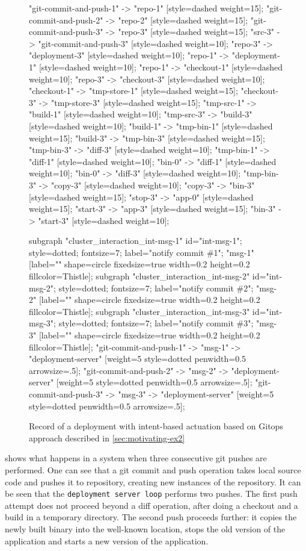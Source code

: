 \begin{figure}[p]
\begin{sideways}
{"git-commit-and-push-1" -> "repo-1" [style=dashed weight=15];
"git-commit-and-push-2" -> "repo-2" [style=dashed weight=15];
"git-commit-and-push-3" -> "repo-3" [style=dashed weight=15];
"src-3" -> "git-commit-and-push-3" [style=dashed weight=10];
"repo-3" -> "deployment-3" [style=dashed weight=10];
"repo-1" -> "deployment-1" [style=dashed weight=10];
"repo-1" -> "checkout-1" [style=dashed weight=10];
"repo-3" -> "checkout-3" [style=dashed weight=10];
"checkout-1" -> "tmp-store-1" [style=dashed weight=15];
"checkout-3" -> "tmp-store-3" [style=dashed weight=15];
"tmp-src-1" -> "build-1" [style=dashed weight=10];
"tmp-src-3" -> "build-3" [style=dashed weight=10];
"build-1" -> "tmp-bin-1" [style=dashed weight=15];
"build-3" -> "tmp-bin-3" [style=dashed weight=15];
"tmp-bin-3" -> "diff-3" [style=dashed weight=10];
"tmp-bin-1" -> "diff-1" [style=dashed weight=10];
"bin-0" -> "diff-1" [style=dashed weight=10];
"bin-0" -> "diff-3" [style=dashed weight=10];
"tmp-bin-3" -> "copy-3" [style=dashed weight=10];
"copy-3" -> "bin-3" [style=dashed weight=15];
"stop-3" -> "app-0" [style=dashed weight=15];
"start-3" -> "app-3" [style=dashed weight=15];
"bin-3" -> "start-3" [style=dashed weight=10];

subgraph "cluster_interaction_int-msg-1" {
id="int-msg-1";
style=dotted;
fontsize=7;
label="notify commit \#1";
"msg-1" [label="" shape=circle fixedsize=true width=0.2 height=0.2 fillcolor=Thistle];
}
subgraph "cluster_interaction_int-msg-2" {
id="int-msg-2";
style=dotted;
fontsize=7;
label="notify commit \#2";
"msg-2" [label="" shape=circle fixedsize=true width=0.2 height=0.2 fillcolor=Thistle];
}
subgraph "cluster_interaction_int-msg-3" {
id="int-msg-3";
style=dotted;
fontsize=7;
label="notify commit \#3";
"msg-3" [label="" shape=circle fixedsize=true width=0.2 height=0.2 fillcolor=Thistle];
}
"git-commit-and-push-1" -> "msg-1" -> "deployment-server" [weight=5 style=dotted penwidth=0.5 arrowsize=.5];
"git-commit-and-push-2" -> "msg-2" -> "deployment-server" [weight=5 style=dotted penwidth=0.5 arrowsize=.5];
"git-commit-and-push-3" -> "msg-3" -> "deployment-server" [weight=5 style=dotted penwidth=0.5 arrowsize=.5];

}
\end{sideways}
\vspace{-4em}
    \caption{Record of a deployment with intent-based actuation based on Gitops approach described in \cref{sec:motivating-ex2}}
    \label{fig:motivating-ex2-dot}
\end{figure}

 shows what happens in a system when three consecutive git pushes are performed. One can see that a git commit and push operation takes local source code and pushes it to repository, creating new instances of the repository. It can be seen that the \texttt{deployment server loop} performs two pushes. The first push attempt does not proceed beyond a diff operation, after doing a checkout and a build in a temporary directory. The second push proceeds further: it copies the newly built binary into the well-known location, stops the old version of the application and starts a new version of the application.

